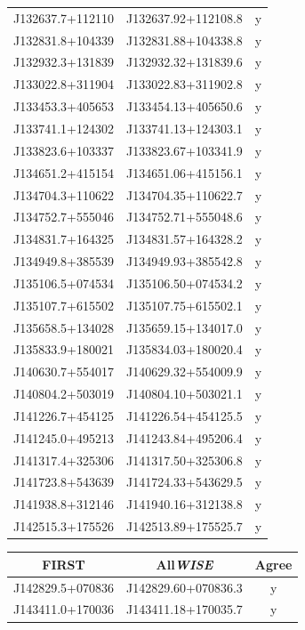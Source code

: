 \begin{table}
\begin{tabular}{ccc}
        J132637.7+112110 & J132637.92+112108.8 & y\\
        J132831.8+104339 & J132831.88+104338.8 & y\\
        J132932.3+131839 & J132932.32+131839.6 & y\\
        J133022.8+311904 & J133022.83+311902.8 & y\\
        J133453.3+405653 & J133454.13+405650.6 & y\\
        J133741.1+124302 & J133741.13+124303.1 & y\\
        J133823.6+103337 & J133823.67+103341.9 & y\\
        J134651.2+415154 & J134651.06+415156.1 & y\\
        J134704.3+110622 & J134704.35+110622.7 & y\\
        J134752.7+555046 & J134752.71+555048.6 & y\\
        J134831.7+164325 & J134831.57+164328.2 & y\\
        J134949.8+385539 & J134949.93+385542.8 & y\\
        J135106.5+074534 & J135106.50+074534.2 & y\\
        J135107.7+615502 & J135107.75+615502.1 & y\\
        J135658.5+134028 & J135659.15+134017.0 & y\\
        J135833.9+180021 & J135834.03+180020.4 & y\\
        J140630.7+554017 & J140629.32+554009.9 & y\\
        J140804.2+503019 & J140804.10+503021.1 & y\\
        J141226.7+454125 & J141226.54+454125.5 & y\\
        J141245.0+495213 & J141243.84+495206.4 & y\\
        J141317.4+325306 & J141317.50+325306.8 & y\\
        J141723.8+543639 & J141724.33+543629.5 & y\\
        J141938.8+312146 & J141940.16+312138.8 & y\\
        J142515.3+175526 & J142513.89+175525.7 & y\\\hline\hline
  \end{tabular}
  \begin{tabular}{ccc}
        \hline\hline
        FIRST & All\emph{WISE} & Agree\\\hline
        J142829.5+070836 & J142829.60+070836.3 & y\\
        J143411.0+170036 & J143411.18+170035.7 & y\\

\end{tabular}
\end{table}
